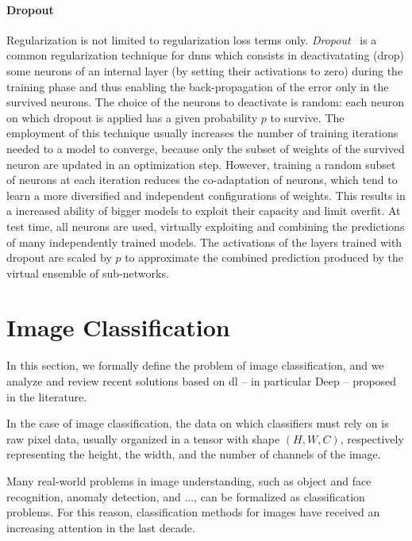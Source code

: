 \paragraph{Dropout}
Regularization is not limited to regularization loss terms only.
\emph{Dropout}~\cite{hinton2012improving} is a common regularization technique for \glspl{dnn} which consists in deactivatating (drop) some neurons of an internal layer (by setting their activations to zero) during the training phase and thus enabling the back-propagation of the error only in the survived neurons.
The choice of the neurons to deactivate is random: each neuron on which dropout is applied has a given probability $p$ to survive.
The employment of this technique usually increases the number of training iterations needed to a model to converge, because only the subset of weights of the survived neuron are updated in an optimization step.
However, training a random subset of neurons at each iteration reduces the co-adaptation of neurons, which tend to learn a more diversified and independent configurations of weights.
This results in a increased ability of bigger models to exploit their capacity and limit overfit.
At test time, all neurons are used, virtually exploiting and combining the predictions of many independently trained models.
The activations of the layers trained with dropout are scaled by $p$ to approximate the combined prediction produced by the virtual ensemble of sub-networks.


\section{Image Classification}
\label{sec:back:image-classification}

In this section, we formally define the problem of image classification, and we analyze and review recent solutions based on \acrlong{dl} -- in particular Deep  -- proposed in the literature.

In the case of image classification, the data on which classifiers must rely on is raw pixel data, usually organized in a tensor with shape $(H, W, C)$, respectively representing the height, the width, and the number of channels of the image.

Many real-world problems in image understanding, such as object and face recognition, anomaly detection, and ..., can be formalized as classification problems.
For this reason, classification methods for images have received an increasing attention in the last decade.

